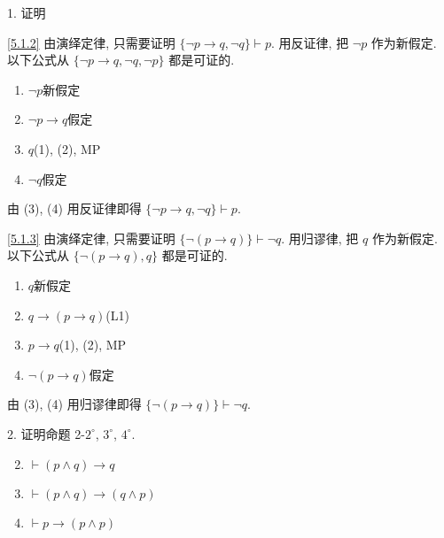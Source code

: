 \documentclass[boxes]{homework}
\begin{document}
\begin{problem}
1. 证明
\end{problem}
\begin{solution}
    \ref{5.1.2}
    由演绎定律, 只需要证明 $\{\lnot p\to q, \lnot q\}\vdash p$. 用反证律, 把 $\lnot p$ 作为新假定. \\
    以下公式从 $\{\lnot p\to q, \lnot q, \lnot p\}$ 都是可证的.
    \begin{enumerate}[label = (\arabic*), itemsep = 0em, topsep = .5em, partopsep = .5em]
        \item $\lnot p$\hfill 新假定
        \item $\lnot p\to q$\hfill 假定
        \item $q$\hfill (1), (2), MP
        \item $\lnot q$\hfill 假定
    \end{enumerate}
    由 (3), (4) 用反证律即得 $\{\lnot p\to q, \lnot q\}\vdash p$.

    \ref{5.1.3}
    由演绎定律, 只需要证明 $\{\lnot(p\to q)\}\vdash \lnot q$. 用归谬律, 把 $q$ 作为新假定.\\
    以下公式从 $\{\lnot(p\to q), q\}$ 都是可证的.
    \begin{enumerate}[label = (\arabic*), itemsep = 0em, topsep = .5em, partopsep = .5em]
        \item $q$\hfill 新假定
        \item $q\to (p\to q)$\hfill (L1)
        \item $p\to q$\hfill (1), (2), MP
        \item $\lnot (p\to q)$\hfill 假定
    \end{enumerate}
    由 (3), (4) 用归谬律即得 $\{\lnot(p\to q)\}\vdash \lnot q$.
\end{solution}
\begin{problem}
2. 证明命题 2-$2^\circ$, $3^\circ$, $4^\circ$.
\begin{enumerate}[label = 2-$\arabic*^\circ$, itemsep = 0em, topsep = .5em, partopsep = .5em]
    \setcounter{enumi}{1}
    \item \label{6.2.2}$\vdash (p\land q)\to q$
    \item \label{6.2.3}$\vdash (p\land q)\to (q\land p)$
    \item \label{6.2.4}$\vdash p\to(p\land p)$
\end{enumerate}
\end{problem}
\end{document}
